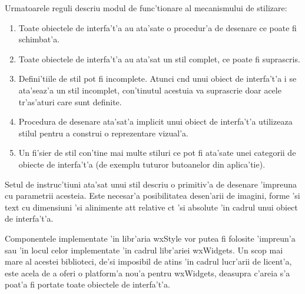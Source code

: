 Urmatoarele reguli descriu modul de func'tionare al mecanismului de stilizare:

\begin{enumerate}
\item Toate obiectele de interfa't'a au ata'sate o procedur'a de desenare ce poate fi schimbat'a.
\item Toate obiectele de interfa't'a au ata'sat un stil complet, ce poate fi suprascris.
\item Defini'tiile de stil pot fi incomplete. Atunci c{\ia}nd unui obiect de interfa't'a i se ata'seaz'a un stil incomplet, con'tinutul acestuia va suprascrie doar acele tr'as'aturi care sunt definite.
\item Procedura de desenare ata'sat'a implicit unui obiect de interfa't'a utilizeaza stilul pentru a construi o reprezentare vizual'a.
\item Un fi'sier de stil con'tine mai multe stiluri ce pot fi ata'sate unei categorii de obiecte de interfa't'a (de exemplu tuturor butoanelor din aplica'tie).
\end{enumerate}

Setul de instruc'tiuni ata'sat unui stil descriu o primitiv'a de desenare 'impreuna cu parametrii acesteia. Este necesar'a posibilitatea desen'arii de imagini, forme 'si text cu dimensiuni 'si alinimente at{\ia}t relative c{\ia}t 'si absolute 'in cadrul unui obiect de interfa't'a.

\medskip

Componentele implementate 'in libr'aria wxStyle vor putea fi folosite 'impreun'a sau 'in locul celor implementate 'in cadrul libr'ariei wxWidgets. Un scop mai mare al acestei biblioteci, de'si imposibil de atins 'in cadrul lucr'arii de licent'a, este acela de a oferi o platform'a nou'a pentru wxWidgets, deasupra c'areia s'a poat'a fi portate toate obiectele de interfa't'a.